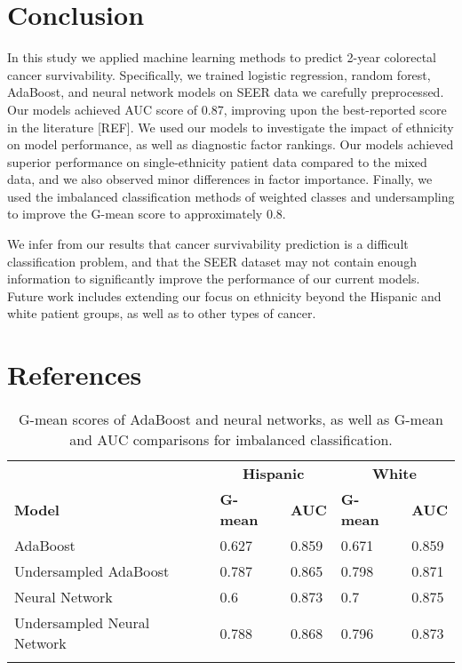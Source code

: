 \documentclass[review]{elsarticle}
\begin{document}
\section{Conclusion}
In this study we applied machine learning methods to predict 2-year colorectal cancer survivability. Specifically, we trained logistic regression, random forest, AdaBoost, and neural network models on SEER data we carefully preprocessed. Our models achieved AUC score of 0.87, improving upon the best-reported score in the literature [REF]. We used our models to investigate the impact of ethnicity on model performance, as well as diagnostic factor rankings. Our models achieved superior performance on single-ethnicity patient data compared to the mixed data, and we also observed minor differences in factor importance. Finally, we used the imbalanced classification methods of weighted classes and undersampling to improve the G-mean score to approximately 0.8. 

We infer from our results that cancer survivability prediction is a difficult classification problem, and that the SEER dataset may not contain enough information to significantly improve the performance of our current models. Future work includes extending our focus on ethnicity beyond the Hispanic and white patient groups, as well as to other types of cancer.


\section*{References}



\begin{table}[H]
	\centering
	\begin{tabular}{lllll}
		& \multicolumn{2}{c}{\textbf{Hispanic }} & \multicolumn{2}{c}{\textbf{White}}  \\
		\textbf{Model}              & \textbf{G-mean} & \textbf{AUC}         & \textbf{G-mean} & \textbf{AUC}      \\ \hline
		AdaBoost                    & 0.627           & 0.859                & 0.671           & 0.859             \\
		Undersampled AdaBoost       & 0.787           & 0.865                & 0.798           & 0.871             \\
		Neural Network              & 0.6             & 0.873                & 0.7             & 0.875             \\
		Undersampled Neural Network & 0.788           & 0.868                & 0.796           & 0.873             \\
		&                 &                      &                 &                  
	\end{tabular}
	\caption{G-mean scores of AdaBoost and neural networks, as well as G-mean and AUC comparisons for imbalanced classification.}
	\label{more-scores}
\end{table}
\end{document}
